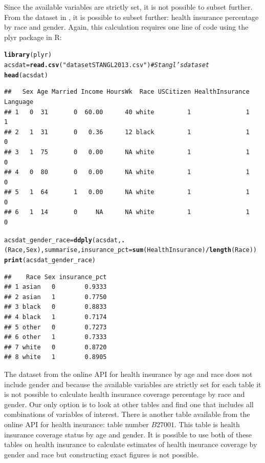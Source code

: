 \documentclass{article}\usepackage[]{graphicx}\usepackage[]{color}
\makeatletter
\newcommand{\hlstr}[1]{\textcolor[rgb]{0.192,0.494,0.8}{#1}}%
\newcommand{\hlcom}[1]{\textcolor[rgb]{0.678,0.584,0.686}{\textit{#1}}}%
\newcommand{\hlopt}[1]{\textcolor[rgb]{0,0,0}{#1}}%
\newcommand{\hlstd}[1]{\textcolor[rgb]{0.345,0.345,0.345}{#1}}%
\newcommand{\hlkwb}[1]{\textcolor[rgb]{0.69,0.353,0.396}{#1}}%
\newcommand{\hlkwc}[1]{\textcolor[rgb]{0.333,0.667,0.333}{#1}}%
\newcommand{\hlkwd}[1]{\textcolor[rgb]{0.737,0.353,0.396}{\textbf{#1}}}%
\newenvironment{kframe}{%
 \def\at@end@of@kframe{}%
 \ifinner\ifhmode%
  \def\at@end@of@kframe{\end{minipage}}%
  \begin{minipage}{\columnwidth}%
 \fi\fi%
 \def\FrameCommand##1{\hskip\@totalleftmargin \hskip-\fboxsep
 \colorbox{shadecolor}{##1}\hskip-\fboxsep
     \hskip-\linewidth \hskip-\@totalleftmargin \hskip\columnwidth}%
 \MakeFramed {\advance\hsize-\width
   \@totalleftmargin\z@ \linewidth\hsize
   \@setminipage}}%
 {\par\unskip\endMakeFramed%
 \at@end@of@kframe}
\newenvironment{knitrout}{}{} %
\makeatother
\begin{document}
Since the available variables are strictly set, it is not possible to subset further.  From the dataset in \citet{stangl:2013}, it is possible to subset further: health insurance percentage by race and gender.  Again, this calculation requires one line of code using the plyr package in R:
\begin{knitrout}
\color{fgcolor}\begin{kframe}
\begin{alltt}
\hlkwd{library}\hlstd{(plyr)}
\hlstd{acsdat} \hlkwb{=} \hlkwd{read.csv}\hlstd{(}\hlstr{"datasetSTANGL2013.csv"}\hlstd{)}  \hlcom{#Stangl's dataset}
\hlkwd{head}\hlstd{(acsdat)}
\end{alltt}
\begin{verbatim}
##   Sex Age Married Income HoursWk  Race USCitizen HealthInsurance Language
## 1   0  31       0  60.00      40 white         1               1        1
## 2   1  31       0   0.36      12 black         1               1        0
## 3   1  75       0   0.00      NA white         1               1        0
## 4   0  80       0   0.00      NA white         1               1        0
## 5   1  64       1   0.00      NA white         1               1        0
## 6   1  14       0     NA      NA white         1               1        0
\end{verbatim}
\begin{alltt}
\hlstd{acsdat_gender_race} \hlkwb{=} \hlkwd{ddply}\hlstd{(acsdat,} \hlkwd{.}\hlstd{(Race, Sex), summarise,} \hlkwc{insurance_pct} \hlstd{=} \hlkwd{sum}\hlstd{(HealthInsurance)}\hlopt{/}\hlkwd{length}\hlstd{(Race))}
\hlkwd{print}\hlstd{(acsdat_gender_race)}
\end{alltt}
\begin{verbatim}
##    Race Sex insurance_pct
## 1 asian   0        0.9333
## 2 asian   1        0.7750
## 3 black   0        0.8833
## 4 black   1        0.7174
## 5 other   0        0.7273
## 6 other   1        0.7333
## 7 white   0        0.8720
## 8 white   1        0.8905
\end{verbatim}
\end{kframe}
\end{knitrout}

The dataset from the online API for health insurance by age and race does not include gender and because the available variables are strictly set for each table it is not possible to calculate health insurance coverage percentage by race and gender.  Our only option is to look at other tables and find one that includes all combinations of variables of interest.  There is another table available from the online API for health insurance: table number $B27001$.  This table is health insurance coverage status by age and gender.  It is possible to use both of these tables on health insurance to calculate estimates of health insurance coverage by gender and race but constructing exact figures is not possible.\\
\\
\end{document}
